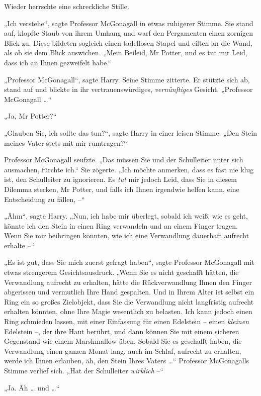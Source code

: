 {Wieder herrschte eine schreckliche Stille.

„Ich verstehe“, sagte Professor McGonagall in etwas ruhigerer Stimme. Sie stand auf, klopfte Staub von ihrem Umhang und warf den Pergamenten einen zornigen Blick zu. Diese bildeten sogleich einen tadellosen Stapel und eilten an die Wand, als ob sie dem Blick auswichen. „Mein Beileid, Mr Potter, und es tut mir Leid, dass ich an Ihnen gezweifelt habe.“

„Professor McGonagall“, sagte Harry. Seine Stimme zitterte. Er stützte sich ab, stand auf und blickte in ihr vertrauenswürdiges, \emph{vernünftiges} Gesicht. „Professor McGonagall …“

„Ja, Mr Potter?“

„Glauben Sie, ich sollte das tun?“, sagte Harry in einer leisen Stimme. „Den Stein meines Vater stets mit mir rumtragen?“

Professor McGonagall seufzte. „Das müssen Sie und der Schulleiter unter sich ausmachen, fürchte ich.“ Sie zögerte. „Ich möchte anmerken, dass es fast nie klug ist, den Schulleiter zu ignorieren. Es \emph{tut} mir jedoch Leid, dass Sie in diesem Dilemma stecken, Mr Potter, und falls ich Ihnen irgendwie helfen kann, eine Entscheidung zu fällen, --“

„Ähm“, sagte Harry. „Nun, ich habe mir überlegt, sobald ich weiß, wie es geht, könnte ich den Stein in einen Ring verwandeln und an einem Finger tragen. Wenn Sie mir beibringen könnten, wie ich eine Verwandlung dauerhaft aufrecht erhalte --“

„Es ist gut, dass Sie mich zuerst gefragt haben“, sagte Professor McGonagall mit etwas strengerem Gesichtsausdruck. „Wenn Sie es nicht geschafft hätten, die Verwandlung aufrecht zu erhalten, hätte die Rückverwandlung Ihnen den Finger abgerissen und vermutlich Ihre Hand gespalten. Und in Ihrem Alter ist selbst ein Ring ein so großes Zielobjekt, dass Sie die Verwandlung nicht langfristig aufrecht erhalten könnten, ohne Ihre Magie wesentlich zu belasten. Ich kann jedoch einen Ring schmieden lassen, mit einer Einfassung für einen Edelstein -- einen \emph{kleinen} Edelstein --, der ihre Haut berührt, und dann können Sie mit einem sicheren Gegenstand wie einem Marshmallow üben. Sobald Sie es geschafft haben, die Verwandlung einen ganzen Monat lang, auch im Schlaf, aufrecht zu erhalten, werde ich Ihnen erlauben, äh, den Stein Ihres Vaters …“ Professor McGonagalls Stimme verlief sich. „Hat der Schulleiter \emph{wirklich} --“

„Ja. Äh … und …“

}
